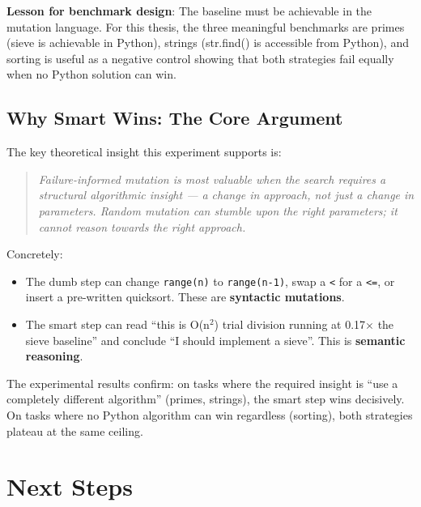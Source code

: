 \documentclass[11pt,a4paper]{article}
\begin{document}
\textbf{Lesson for benchmark design}: The baseline must be achievable in the
mutation language. For this thesis, the three meaningful benchmarks are
primes (sieve is achievable in Python), strings (str.find() is accessible
from Python), and sorting is useful as a negative control showing that
both strategies fail equally when no Python solution can win.

\subsection{Why Smart Wins: The Core Argument}

The key theoretical insight this experiment supports is:

\begin{quote}
\textit{Failure-informed mutation is most valuable when the search requires
a structural algorithmic insight — a change in \emph{approach}, not just a
change in \emph{parameters}. Random mutation can stumble upon the right
parameters; it cannot reason towards the right approach.}
\end{quote}

Concretely:
\begin{itemize}
  \item The dumb step can change \texttt{range(n)} to \texttt{range(n-1)},
    swap a \texttt{<} for a \texttt{<=}, or insert a pre-written quicksort.
    These are \textbf{syntactic mutations}.
  \item The smart step can read ``this is O(n$^2$) trial division running at
    0.17$\times$ the sieve baseline'' and conclude ``I should implement a
    sieve''. This is \textbf{semantic reasoning}.
\end{itemize}

The experimental results confirm: on tasks where the required insight is
``use a completely different algorithm'' (primes, strings), the smart step
wins decisively. On tasks where no Python algorithm can win regardless (sorting),
both strategies plateau at the same ceiling.

\section{Next Steps}
\end{document}
